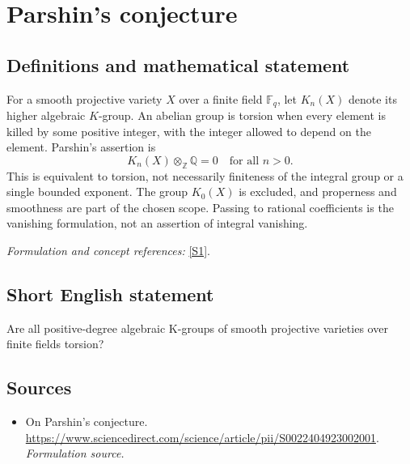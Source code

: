 \documentclass[11pt]{article}
\begin{document}
\section*{\texorpdfstring{Parshin's conjecture}{Parshin's conjecture}}\label{statement}
\subsection{Definitions and mathematical statement}
For a smooth projective variety $X$ over a finite field ${\mathbb{F}}_q$, let $K_n(X)$ denote its higher algebraic $K$-group. An abelian group is torsion when every element is killed by some positive integer, with the integer allowed to depend on the element. Parshin's assertion is
\[
 K_n(X)\otimes_{{\mathbb{Z}}}{\mathbb{Q}}=0\quad\text{for all }n>0.
\]
This is equivalent to torsion, not necessarily finiteness of the integral group or a single bounded exponent. The group $K_0(X)$ is excluded, and properness and smoothness are part of the chosen scope. Passing to rational coefficients is the vanishing formulation, not an assertion of integral vanishing.
\par\smallskip\textit{Formulation and concept references:} \href{https://www.sciencedirect.com/science/article/pii/S0022404923002001}{[S1]}.

\subsection{Short English statement}
Are all positive-degree algebraic K-groups of smooth projective varieties over finite fields torsion?
\subsection{Sources}
\begin{itemize}
\item[S1]On Parshin's conjecture.
\url{https://www.sciencedirect.com/science/article/pii/S0022404923002001}.
\textit{Formulation source.}
\end{itemize}
\end{document}
